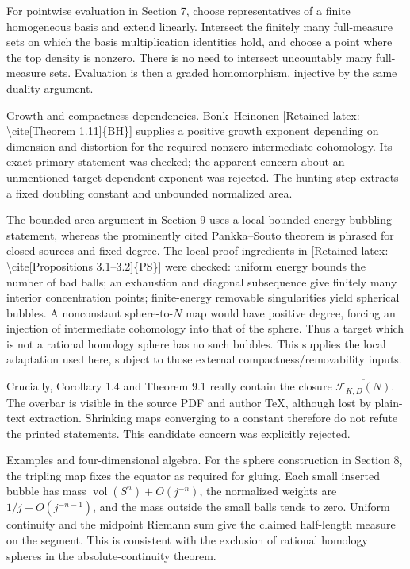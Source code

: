\documentclass[10pt]{article}
\begin{document}
For pointwise evaluation in Section 7, choose representatives of a finite homogeneous basis and extend linearly. Intersect the finitely many full-measure sets on which the basis multiplication identities hold, and choose a point where the top density is nonzero. There is no need to intersect uncountably many full-measure sets. Evaluation is then a graded homomorphism, injective by the same duality argument.\par
Growth and compactness dependencies. Bonk–Heinonen [Retained latex: \textbackslash{}cite[Theorem 1.11]\{BH\}] supplies a positive growth exponent depending on dimension and distortion for the required nonzero intermediate cohomology. Its exact primary statement was checked; the apparent concern about an unmentioned target-dependent exponent was rejected. The hunting step extracts a fixed doubling constant and unbounded normalized area.\par
The bounded-area argument in Section 9 uses a local bounded-energy bubbling statement, whereas the prominently cited Pankka–Souto theorem is phrased for closed sources and fixed degree. The local proof ingredients in [Retained latex: \textbackslash{}cite[Propositions 3.1--3.2]\{PS\}] were checked: uniform energy bounds the number of bad balls; an exhaustion and diagonal subsequence give finitely many interior concentration points; finite-energy removable singularities yield spherical bubbles. A nonconstant sphere-to-\(N\) map would have positive degree, forcing an injection of intermediate cohomology into that of the sphere. Thus a target which is not a rational homology sphere has no such bubbles. This supplies the local adaptation used here, subject to those external compactness/removability inputs.\par
Crucially, Corollary 1.4 and Theorem 9.1 really contain the closure \(\overline{\mathcal F_{K,D}(N)}\). The overbar is visible in the source PDF and author TeX, although lost by plain-text extraction. Shrinking maps converging to a constant therefore do not refute the printed statements. This candidate concern was explicitly rejected.\par
Examples and four-dimensional algebra. For the sphere construction in Section 8, the tripling map fixes the equator as required for gluing. Each small inserted bubble has mass \(\operatorname{vol}(S^n)+O(j^{-n})\), the normalized weights are \(1/j+O(j^{-n-1})\), and the mass outside the small balls tends to zero. Uniform continuity and the midpoint Riemann sum give the claimed half-length measure on the segment. This is consistent with the exclusion of rational homology spheres in the absolute-continuity theorem.\par
\end{document}
